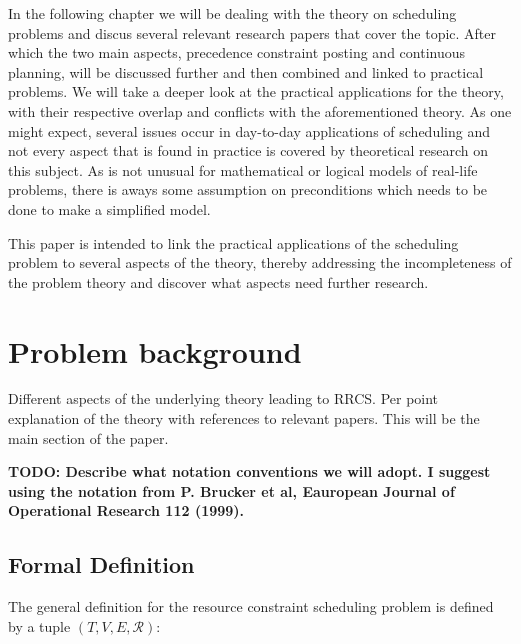 \documentclass{article}
\newcommand{\TODO}[1]{{\color{red}\textbf{TODO: #1}}}
\begin{document}
In the following chapter we will be dealing with the theory on scheduling problems and discus several relevant research papers that cover the topic.
After which the two main aspects, precedence constraint posting and continuous planning, will be discussed further and then combined and linked to practical problems.
We will take a deeper look at the practical applications for the theory, with their respective overlap and conflicts with the aforementioned theory.
As one might expect, several issues occur in day-to-day applications of scheduling and not every aspect that is found in practice is covered by theoretical research on this subject.
As is not unusual for mathematical or logical models of real-life problems, there is aways some assumption on preconditions which needs to be done to make a simplified model.

This paper is intended to link the practical applications of the scheduling problem to several aspects of the theory, thereby addressing the incompleteness of the problem theory and discover what aspects need further research.


\newpage

\section{Problem background}

Different aspects of the underlying theory leading to RRCS.  Per point explanation of the theory with references to relevant papers. This will be the main section of the paper.

\TODO{Describe what notation conventions we will adopt. I suggest using the notation from P. Brucker et al, Eauropean Journal of Operational Research 112 (1999). }

\subsection{Formal Definition}
The general definition for the resource constraint scheduling problem is defined by a tuple $(T, V, E, \mathcal{R})$: \cite{brucker99}
\end{document}
